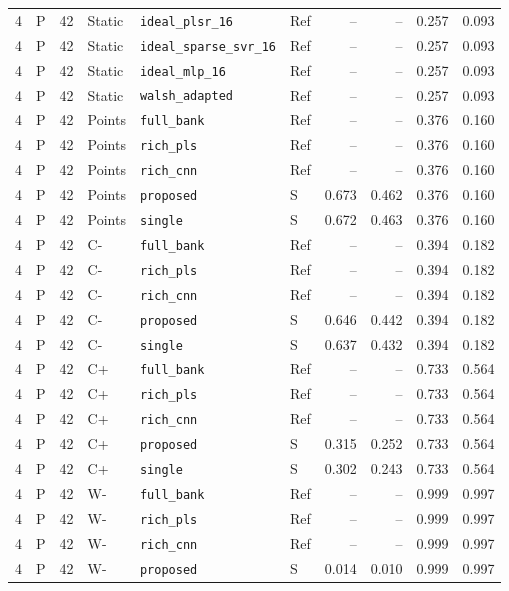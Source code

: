 \documentclass[10pt,a4paper]{article}
\begin{document}
\begin{longtable}{rlrlllrrrr}
4 & P & 42 & Static & \texttt{ideal\_plsr\_16} & Ref & -- & -- & 0.257 & 0.093 \\
4 & P & 42 & Static & \texttt{ideal\_sparse\_svr\_16} & Ref & -- & -- & 0.257 & 0.093 \\
4 & P & 42 & Static & \texttt{ideal\_mlp\_16} & Ref & -- & -- & 0.257 & 0.093 \\
4 & P & 42 & Static & \texttt{walsh\_adapted} & Ref & -- & -- & 0.257 & 0.093 \\
4 & P & 42 & Points & \texttt{full\_bank} & Ref & -- & -- & 0.376 & 0.160 \\
4 & P & 42 & Points & \texttt{rich\_pls} & Ref & -- & -- & 0.376 & 0.160 \\
4 & P & 42 & Points & \texttt{rich\_cnn} & Ref & -- & -- & 0.376 & 0.160 \\
4 & P & 42 & Points & \texttt{proposed} & S & 0.673 & 0.462 & 0.376 & 0.160 \\
4 & P & 42 & Points & \texttt{single} & S & 0.672 & 0.463 & 0.376 & 0.160 \\
4 & P & 42 & C- & \texttt{full\_bank} & Ref & -- & -- & 0.394 & 0.182 \\
4 & P & 42 & C- & \texttt{rich\_pls} & Ref & -- & -- & 0.394 & 0.182 \\
4 & P & 42 & C- & \texttt{rich\_cnn} & Ref & -- & -- & 0.394 & 0.182 \\
4 & P & 42 & C- & \texttt{proposed} & S & 0.646 & 0.442 & 0.394 & 0.182 \\
4 & P & 42 & C- & \texttt{single} & S & 0.637 & 0.432 & 0.394 & 0.182 \\
4 & P & 42 & C+ & \texttt{full\_bank} & Ref & -- & -- & 0.733 & 0.564 \\
4 & P & 42 & C+ & \texttt{rich\_pls} & Ref & -- & -- & 0.733 & 0.564 \\
4 & P & 42 & C+ & \texttt{rich\_cnn} & Ref & -- & -- & 0.733 & 0.564 \\
4 & P & 42 & C+ & \texttt{proposed} & S & 0.315 & 0.252 & 0.733 & 0.564 \\
4 & P & 42 & C+ & \texttt{single} & S & 0.302 & 0.243 & 0.733 & 0.564 \\
4 & P & 42 & W- & \texttt{full\_bank} & Ref & -- & -- & 0.999 & 0.997 \\
4 & P & 42 & W- & \texttt{rich\_pls} & Ref & -- & -- & 0.999 & 0.997 \\
4 & P & 42 & W- & \texttt{rich\_cnn} & Ref & -- & -- & 0.999 & 0.997 \\
4 & P & 42 & W- & \texttt{proposed} & S & 0.014 & 0.010 & 0.999 & 0.997 \\

\end{longtable}
\end{document}
